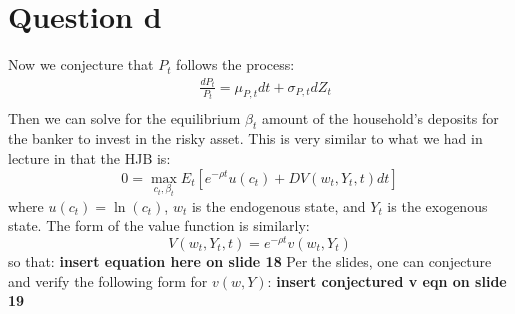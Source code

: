 \documentclass{article}
\begin{document}
\section*{Question d}
Now we conjecture that $P_t$ follows the process:
\[
\begin{aligned}
    &\frac{d P_{t}}{P_{t}}=\mu_{P, t} d t+\sigma_{P, t} d Z_{t}\\
\end{aligned}
\]
Then we can solve for the equilibrium $\beta_t$ amount of the household's deposits for the banker to invest in the risky asset. This is very similar to what we had in lecture in that the HJB is:
\[
0 = \max_{c_t, \beta_t}E_t[e^{-\rho t}u(c_t) + D V(w_t, Y_t, t) d t]    
\]
where $u(c_t) = \ln(c_t) $, $w_t$ is the endogenous state, and $Y_t$ is the exogenous state. The form of the value function is similarly:
\[
V(w_t, Y_t, t) = e^{-\rho t} v(w_t, Y_t)    
\]
so that:
\textbf{insert equation here on slide 18} 
Per the slides, one can conjecture and verify the following form for $v(w, Y)$:
\textbf{insert conjectured v eqn on slide 19}
\end{document}
